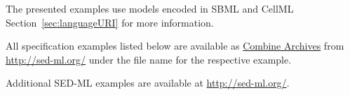 \documentclass[pdftex,rgb,dvipsnames,svgnames,hyperref,table]{report}
\begin{document}
The presented examples use models encoded in SBML and CellML Section~\ref{sec:languageURI} for more information.

All specification examples listed below are available as \hyperref[sec:archive]{Combine Archives} from \url{http://sed-ml.org/} under the  file name for the respective example. 

Additional SED-ML examples are available at \url{http://sed-ml.org/}.







\end{document}
